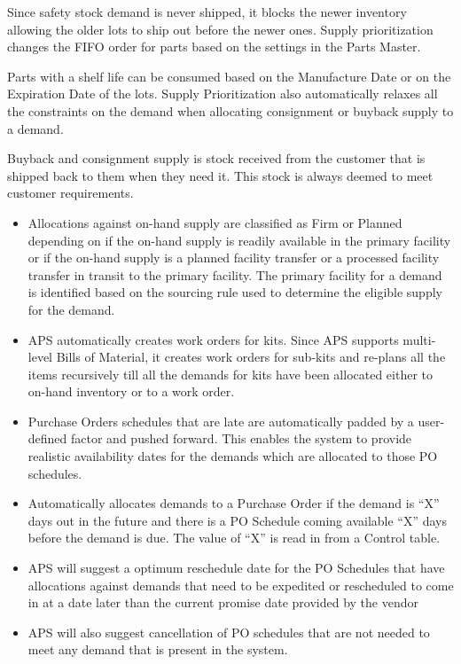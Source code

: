 \documentclass[letterpaper,10pt,english]{sphinxmanual}
\begin{document}
Since safety stock demand is never shipped,
it blocks the newer inventory allowing the older lots to ship out before
the newer ones. Supply prioritization changes the FIFO order for parts
based on the settings in the Parts Master.

Parts with a shelf life can
be consumed based on the Manufacture Date or on the Expiration Date of
the lots. Supply Prioritization also automatically relaxes all the
constraints on the demand when allocating consignment or buyback supply
to a demand.

Buyback and consignment supply is stock received from the
customer that is shipped back to them when they need it. This stock is
always deemed to meet customer requirements.
\begin{itemize}
\item {} 
Allocations against on-hand supply are classified as Firm or Planned
depending on if the on-hand supply is readily available in the
primary facility or if the on-hand supply is a planned facility
transfer or a processed facility transfer in transit to the primary
facility. The primary facility for a demand is identified based on
the sourcing rule used to determine the eligible supply for the
demand.

\item {} 
APS automatically creates work orders for kits. Since APS supports
multi-level Bills of Material, it creates work orders for sub-kits
and re-plans all the items recursively till all the demands for kits
have been allocated either to on-hand inventory or to a work order.

\item {} 
Purchase Orders schedules that are late are automatically padded by a
user-defined factor and pushed forward. This enables the system to
provide realistic availability dates for the demands which are
allocated to those PO schedules.

\item {} 
Automatically allocates demands to a Purchase Order if the demand is
“X” days out in the future and there is a PO Schedule coming
available “X” days before the demand is due. The value of “X” is read
in from a Control table.

\item {} 
APS will suggest a optimum reschedule date for the PO Schedules that
have allocations against demands that need to be expedited or
rescheduled to come in at a date later than the current promise date
provided by the vendor

\item {} 
APS will also suggest cancellation of PO schedules that are not
needed to meet any demand that is present in the system.

\end{itemize}
\end{document}
